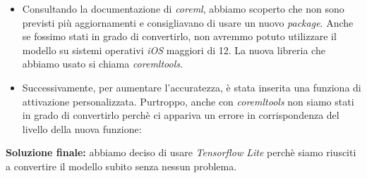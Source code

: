 \begin{itemize}
	\item Consultando la documentazione di \textit{coreml}, abbiamo scoperto che non sono previsti più aggiornamenti e consigliavano di usare un nuovo \textit{package}. Anche se fossimo stati in grado di convertirlo, non avremmo potuto utilizzare il modello su sistemi operativi \textit{iOS} maggiori di 12. La nuova libreria che abbiamo usato si chiama \textit{coremltools}.
	\vspace*{2ex}
	\vspace*{2ex}
	\item Successivamente, per aumentare l'accuratezza, è stata inserita una funziona di attivazione personalizzata. Purtroppo, anche con \textit{coremltools} non siamo stati in grado di convertirlo perchè ci appariva un errore in corrispondenza del livello della nuova funzione:
	\vspace*{2ex}
	\vspace*{2ex}
	
\end{itemize}
\textbf{Soluzione finale:} abbiamo deciso di usare \textit{Tensorflow Lite} perchè siamo riusciti a convertire il modello subito senza nessun problema.

